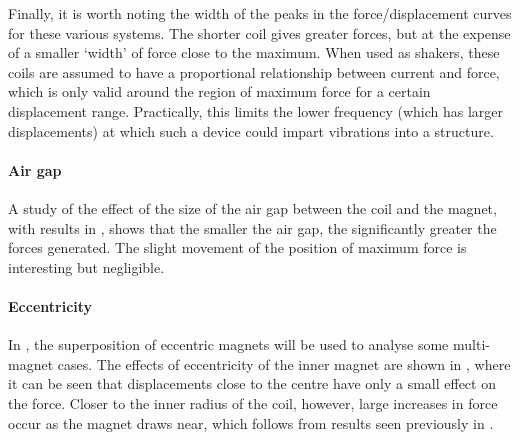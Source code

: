 Finally, it is worth noting the width of the peaks in the
force/displacement curves for these various systems. The shorter coil
gives greater forces, but at the expense of a smaller `width' of force
close to the maximum. When used as shakers, these coils are assumed to
have a proportional relationship between current and force, which is only valid
around the region of maximum force for a certain displacement range.
Practically, this limits the lower frequency (which has larger displacements)
at which such a device could impart vibrations into a structure.

\paragraph{Air gap}

A study of the effect of the size of the air gap between the coil and the
magnet, with results in , shows that the smaller the air
gap, the significantly greater the forces generated. The slight movement of
the position of maximum force is interesting but negligible.

\begin{figure}
  \begin{subfigure}
  \end{subfigure}\par
  \begin{subfigure}
  \end{subfigure}
\end{figure}

\paragraph{Eccentricity}

In , the superposition of eccentric magnets will be used to
analyse some multi-magnet cases. The effects of eccentricity of the inner
magnet are shown in , where it can be seen that
displacements close to the centre have only a small effect on the force.
Closer to the inner radius of the coil, however, large increases in force
occur as the magnet draws near, which follows from results seen previously in
.

